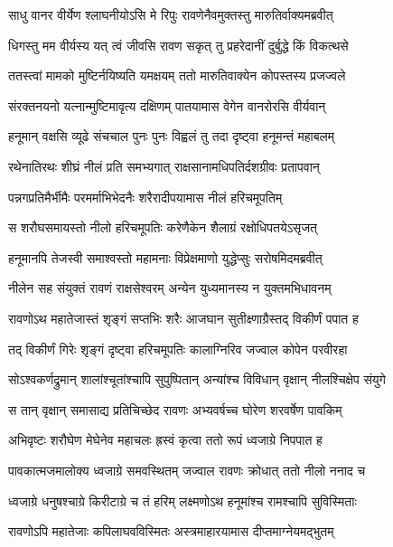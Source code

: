 \twolineshloka
{साधु वानर वीर्येण श्लाघनीयोऽसि मे रिपुः}
{रावणेनैवमुक्तस्तु मारुतिर्वाक्यमब्रवीत्} %

\twolineshloka
{धिगस्तु मम वीर्यस्य यत् त्वं जीवसि रावण}
{सकृत् तु प्रहरेदानीं दुर्बुद्धे किं विकत्थसे} %

\twolineshloka
{ततस्त्वां मामको मुष्टिर्नयिष्यति यमक्षयम्}
{ततो मारुतिवाक्येन कोपस्तस्य प्रजज्वले} %

\twolineshloka
{संरक्तनयनो यत्नान्मुष्टिमावृत्य दक्षिणम्}
{पातयामास वेगेन वानरोरसि वीर्यवान्} %

\twolineshloka
{हनूमान् वक्षसि व्यूढे संचचाल पुनः पुनः}
{विह्वलं तु तदा दृष्ट्वा हनूमन्तं महाबलम्} %

\twolineshloka
{रथेनातिरथः शीघ्रं नीलं प्रति समभ्यगात्}
{राक्षसानामधिपतिर्दशग्रीवः प्रतापवान्} %

\twolineshloka
{पन्नगप्रतिमैर्भीमैः परमर्माभिभेदनैः}
{शरैरादीपयामास नीलं हरिचमूपतिम्} %

\twolineshloka
{स शरौघसमायस्तो नीलो हरिचमूपतिः}
{करेणैकेन शैलाग्रं रक्षोधिपतयेऽसृजत्} %

\twolineshloka
{हनूमानपि तेजस्वी समाश्वस्तो महामनाः}
{विप्रेक्षमाणो युद्धेप्सुः सरोषमिदमब्रवीत्} %

\twolineshloka
{नीलेन सह संयुक्तं रावणं राक्षसेश्वरम्}
{अन्येन युध्यमानस्य न युक्तमभिधावनम्} %

\twolineshloka
{रावणोऽथ महातेजास्तं शृङ्गं सप्तभिः शरैः}
{आजघान सुतीक्ष्णाग्रैस्तद् विकीर्णं पपात ह} %

\twolineshloka
{तद् विकीर्णं गिरेः शृङ्गं दृष्ट्वा हरिचमूपतिः}
{कालाग्निरिव जज्वाल कोपेन परवीरहा} %

\twolineshloka
{सोऽश्वकर्णद्रुमान् शालांश्चूतांश्चापि सुपुष्पितान्}
{अन्यांश्च विविधान् वृक्षान् नीलश्चिक्षेप संयुगे} %

\twolineshloka
{स तान् वृक्षान् समासाद्य प्रतिचिच्छेद रावणः}
{अभ्यवर्षच्च घोरेण शरवर्षेण पावकिम्} %

\twolineshloka
{अभिवृष्टः शरौघेण मेघेनेव महाचलः}
{ह्रस्वं कृत्वा ततो रूपं ध्वजाग्रे निपपात ह} %

\twolineshloka
{पावकात्मजमालोक्य ध्वजाग्रे समवस्थितम्}
{जज्वाल रावणः क्रोधात् ततो नीलो ननाद च} %

\twolineshloka
{ध्वजाग्रे धनुषश्चाग्रे किरीटाग्रे च तं हरिम्}
{लक्ष्मणोऽथ हनूमांश्च रामश्चापि सुविस्मिताः} %

\twolineshloka
{रावणोऽपि महातेजाः कपिलाघवविस्मितः}
{अस्त्रमाहारयामास दीप्तमाग्नेयमद्भुतम्} %

